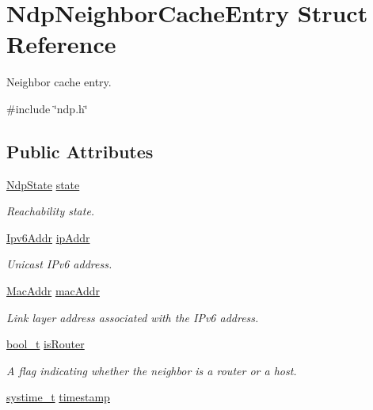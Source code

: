 \hypertarget{structNdpNeighborCacheEntry}{}\section{Ndp\+Neighbor\+Cache\+Entry Struct Reference}
\label{structNdpNeighborCacheEntry}


Neighbor cache entry.  




{\ttfamily \#include \char`\"{}ndp.\+h\char`\"{}}

\subsection*{Public Attributes}
\begin{DoxyCompactItemize}
\item 
\hyperlink{ndp_8h_a97a48b3286230efa6a168a56910ea479}{Ndp\+State} \hyperlink{structNdpNeighborCacheEntry_a574ecea20d21d33352612dcd9583e3d5}{state}
\begin{DoxyCompactList}\small\item\em Reachability state. \end{DoxyCompactList}\item 
\hyperlink{ipv6_8h_aed0cbc40c61ed5b4fb681ebc55237e89}{Ipv6\+Addr} \hyperlink{structNdpNeighborCacheEntry_a3c02dac138bb8d8ae45ad1de8c324221}{ip\+Addr}
\begin{DoxyCompactList}\small\item\em Unicast I\+Pv6 address. \end{DoxyCompactList}\item 
\hyperlink{ethernet_8h_a1e00ed3977e8a770e8b4ae4cb306d1c0}{Mac\+Addr} \hyperlink{structNdpNeighborCacheEntry_a1e8f8ff5e8f92123bb81a40643b13c2c}{mac\+Addr}
\begin{DoxyCompactList}\small\item\em Link layer address associated with the I\+Pv6 address. \end{DoxyCompactList}\item 
\hyperlink{compiler__port_8h_a812d16e5494522586b3784e55d479912}{bool\+\_\+t} \hyperlink{structNdpNeighborCacheEntry_af1bf52654360db588714ce7c21e20887}{is\+Router}
\begin{DoxyCompactList}\small\item\em A flag indicating whether the neighbor is a router or a host. \end{DoxyCompactList}\item 
\hyperlink{compiler__port_8h_ae3e32a98d431a02106616da3071832dd}{systime\+\_\+t} \hyperlink{structNdpNeighborCacheEntry_a09717542b16d54caabb3494f39b8864c}{timestamp}

\end{DoxyCompactItemize}
